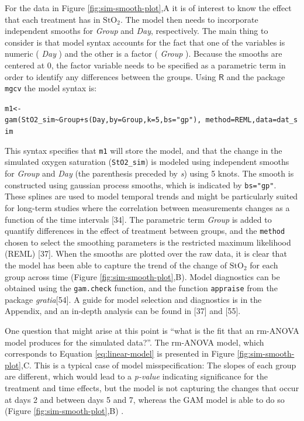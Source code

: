 \documentclass[
]{article}
\begin{document}
For the data in Figure \ref{fig:sim-smooth-plot},A it is of interest to know the effect that each treatment has in \(\mbox{StO}_2\). The model then needs to incorporate independent smooths for \emph{Group} and \emph{Day}, respectively. The main thing to consider is that model syntax accounts for the fact that one of the variables is numeric ( \emph{Day} ) and the other is a factor ( \emph{Group} ). Because the smooths are centered at 0, the factor variable needs to be specified as a parametric term in order to identify any differences between the groups. Using \(\textsf{R}\) and the package \texttt{mgcv} the model syntax is:

\texttt{m1\textless{}-gam(StO2\_sim\textasciitilde{}Group+s(Day,by=Group,k=5,bs="gp"),\ method=\textquotesingle{}REML\textquotesingle{},data=dat\_sim}

This syntax specifies that \texttt{m1} will store the model, and that the change in the simulated oxygen saturation (\texttt{StO2\_sim}) is modeled using independent smooths for \emph{Group} and \emph{Day} (the parenthesis preceded by \emph{s}) using 5 knots. The smooth is constructed using gaussian process smooths, which is indicated by \texttt{bs="gp"}. These splines are used to model temporal trends and might be particularly suited for long-term studies where the correlation between measurements changes as a function of the time intervals {[}34{]}. The parametric term \emph{Group} is added to quantify differences in the effect of treatment between groups, and the \texttt{method} chosen to select the smoothing parameters is the restricted maximum likelihood (REML) {[}37{]}. When the smooths are plotted over the raw data, it is clear that the model has been able to capture the trend of the change of \(\mbox{StO}_2\) for each group across time (Figure \ref{fig:sim-smooth-plot},B). Model diagnostics can be obtained using the \texttt{gam.check} function, and the function \texttt{appraise} from the package \emph{gratia}{[}54{]}. A guide for model selection and diagnostics is in the Appendix, and an in-depth analysis can be found in {[}37{]} and {[}55{]}.

One question that might arise at this point is ``what is the fit that an rm-ANOVA model produces for the simulated data?''. The rm-ANOVA model, which corresponds to Equation \eqref{eq:linear-model} is presented in Figure \ref{fig:sim-smooth-plot},C. This is a typical case of model misspecification: The slopes of each group are different, which would lead to a \emph{p-value} indicating significance for the treatment and time effects, but the model is not capturing the changes that occur at days 2 and between days 5 and 7, whereas the GAM model is able to do so (Figure \ref{fig:sim-smooth-plot},B) .
\end{document}

